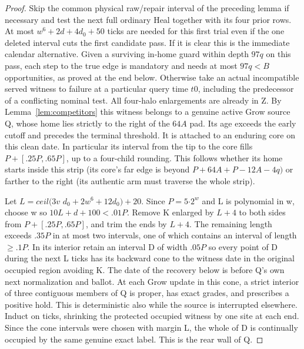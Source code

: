\begin{proof}
Skip the common physical raw/repair interval of the preceding lemma if necessary and test the next full ordinary Heal together with its four prior rows. At most \(w^6+2d+4d_0+50\) ticks are needed for this first trial even if the one deleted interval cuts the first candidate pass. If it is clear this is the immediate calendar alternative. Given a surviving in-home guard within depth \(97q\) on this pass, each step to the true edge is mandatory and needs at most \(97q<B\) opportunities, as proved at the end below. Otherwise take an actual incompatible served witness to failure at a particular query time \(t0\), including the predecessor of a conflicting nominal test. All four-halo enlargements are already in Z. By Lemma~\ref{lem:competitors} this witness belongs to a genuine active Grow source Q, whose home lies strictly to the right of the \(64A\) pad. Its age exceeds the early cutoff and precedes the terminal threshold. It is attached to an enduring core on this clean date. In particular its interval from the tip to the core fills \(P+[.25P,.65P]\), up to a four-child rounding. This follows whether its home starts inside this strip (its core's far edge is beyond \(P+64A+P- 12A- 4q)\) or farther to the right (its authentic arm must traverse the whole strip).

Let \(L=ceil(3v\) \(d_0+2w^6+12d_0)+20\). Since \(P=5\)\(\cdot\)\(2^w\) and L is polynomial in w, choose w so \(10L+d+100<.01P\). Remove K enlarged by \(L+4\) to both sides from \(P+[.25P,.65P]\), and trim the ends by \(L+4\). The remaining length exceeds \(.35P\) in at most two intervals, one of which contains an interval of length \(\ge\).\(1P\). In its interior retain an interval D of width \(.05P\) so every point of D during the next L ticks has its backward cone to the witness date in the original occupied region avoiding K. The date of the recovery below is before Q's own next normalization and ballot. At each Grow update in this cone, a strict interior of three contiguous members of Q is proper, has exact grades, and prescribes a positive hold. This is deterministic also while the source is interrupted elsewhere. Induct on ticks, shrinking the protected occupied witness by one site at each end. Since the cone intervals were chosen with margin L, the whole of D is continually occupied by the same genuine exact label. This is the rear wall of Q.


\end{proof}

